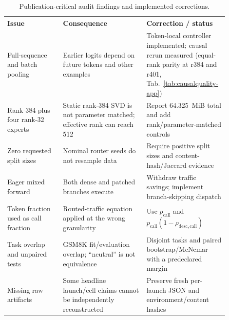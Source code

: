 \begin{table}[ht]
\centering
\footnotesize
\caption{Publication-critical audit findings and implemented corrections.}
\label{tab:ablationladder}
\begin{tabular}{>{\raggedright\arraybackslash}p{0.24\linewidth}>{\raggedright\arraybackslash}p{0.36\linewidth}>{\raggedright\arraybackslash}p{0.30\linewidth}}
\toprule
Issue & Consequence & Correction / status \\
\midrule
Full-sequence and batch pooling & Earlier logits depend on future tokens and other examples & Token-local controller implemented; causal rerun measured (equal-rank parity at r384 and r401, Tab.~\ref{tab:causalquality-app}) \\
Rank-384 plus four rank-32 experts & Static rank-384 SVD is not parameter matched; effective rank can reach 512 & Report 64.325~MiB total and add rank/parameter-matched controls \\
Zero requested split sizes & Nominal router seeds do not resample data & Require positive split sizes and content-hash/Jaccard evidence \\
Eager mixed forward & Both dense and patched branches execute & Withdraw traffic savings; implement branch-skipping dispatch \\
Token fraction used as call fraction & Routed-traffic equation applied at the wrong granularity & Use $p_{\mathrm{call}}$ and $p_{\mathrm{call}}(1-\rho_{\mathrm{desc,call}})$ \\
Task overlap and unpaired tests & GSM8K fit/evaluation overlap; ``neutral'' is not equivalence & Disjoint tasks and paired bootstrap/McNemar with a predeclared margin \\
Missing raw artifacts & Some headline launch/cell claims cannot be independently reconstructed & Preserve fresh per-launch JSON and environment/content hashes \\
\bottomrule
\end{tabular}
\end{table}

